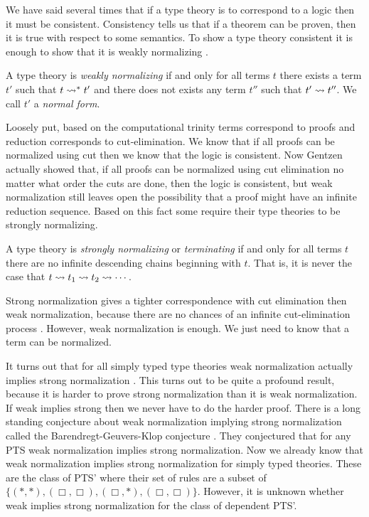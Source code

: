 We have said several times that if a type theory is to correspond to a
logic then it must be consistent.  Consistency tells us that if a
theorem can be proven, then it is true with respect to some semantics.
To show a type theory consistent it is enough to show that it is
weakly normalizing \cite{Sorensen:2006}.
\begin{definition}
  \label{def:weak_norm}
  A type theory is \emph{weakly normalizing} if and only for all terms $t$
  there exists a term $t'$ such that $t \rightsquigarrow^* t'$ and there does
  not exists any term $t''$ such that $t' \rightsquigarrow t''$.  We
  call $t'$ a \emph{normal form}.
\end{definition}
\noindent
Loosely put, based on the computational trinity terms correspond to
proofs and reduction corresponds to cut-elimination.  We know that if
all proofs can be normalized using cut then we know that the logic is
consistent.  Now Gentzen actually showed that, if all proofs can be
normalized using cut elimination no matter what order the cuts are
done, then the logic is consistent, but weak normalization still
leaves open the possibility that a proof might have an infinite
reduction sequence. Based on this fact some require their type
theories to be strongly normalizing.
\begin{definition}
  \label{def:strong_norm}
  A type theory is \emph{strongly normalizing} or \emph{terminating}
  if and only for all terms $t$ there are no infinite descending
  chains beginning with $t$.  That is, it is never the case that $t
  \rightsquigarrow t_1 \rightsquigarrow t_2 \rightsquigarrow \cdots$.
\end{definition}
\noindent
Strong normalization gives a tighter correspondence with cut
elimination then weak normalization, because there are no chances of
an infinite cut-elimination process \cite{Sorensen:2006}.  However,
weak normalization is enough.  We just need to know that a term can be
normalized.

It turns out that for all simply typed type theories weak
normalization actually implies strong normalization
\cite{Sorensen:1997}.  This turns out to be quite a profound result,
because it is harder to prove strong normalization than it is weak
normalization.  If weak implies strong then we never have to do the
harder proof.  There is a long standing conjecture about weak
normalization implying strong normalization called the
Barendregt-Geuvers-Klop conjecture \cite{Sorensen:2006}.  They
conjectured that for any PTS weak normalization implies strong
normalization.  Now we already know that weak normalization implies
strong normalization for simply typed theories.  These are the class
of PTS' where their set of rules are a subset of
$\{(*,*),(\Box,\Box),(\Box,*),(\Box,\Box)\}$.  However, it is unknown
whether weak implies strong normalization for the class of dependent
PTS'.

